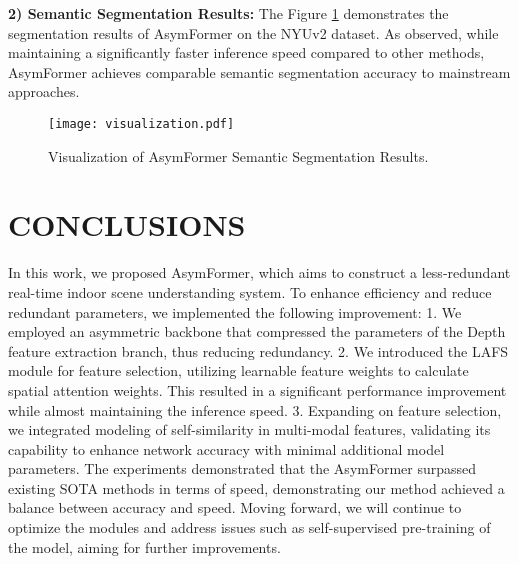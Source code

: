 \documentclass[letterpaper, 10 pt, conference]{ieeeconf}
\begin{document}
\textbf{2) Semantic Segmentation Results:} The Figure \ref{fig:result} demonstrates the segmentation results of AsymFormer on the NYUv2 dataset. As observed, while maintaining a significantly faster inference speed compared to other methods, AsymFormer achieves comparable semantic segmentation accuracy to mainstream approaches.

\begin{figure}[htbp]
\vspace {+0.7em}
\centering
\texttt{[image: visualization.pdf]}
\caption{\label{fig:result}Visualization of AsymFormer Semantic Segmentation Results.}
\vspace {-1.1em}
\end{figure}


\section{CONCLUSIONS}
In this work, we proposed AsymFormer, which aims to construct a less-redundant real-time indoor scene understanding system. To enhance efficiency and reduce redundant parameters, we implemented the following improvement: 1. We employed an asymmetric backbone that compressed the parameters of the Depth feature extraction branch, thus reducing redundancy. 2. We introduced the LAFS module for feature selection, utilizing learnable feature weights to calculate spatial attention weights. This resulted in a significant performance improvement while almost maintaining the inference speed. 3. Expanding on feature selection, we integrated modeling of self-similarity in multi-modal features, validating its capability to enhance network accuracy with minimal additional model parameters. The experiments demonstrated that the AsymFormer surpassed existing SOTA methods in terms of speed, demonstrating our method achieved a balance between accuracy and speed. Moving forward, we will continue to optimize the modules and address issues such as self-supervised pre-training of the model, aiming for further improvements.

{\small


}
\end{document}
